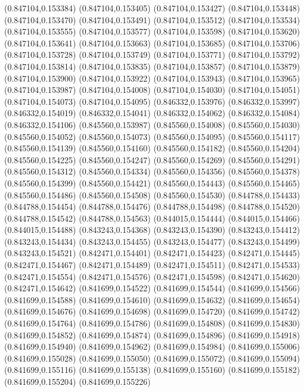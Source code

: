 (0.847104,0.153384)
(0.847104,0.153405)
(0.847104,0.153427)
(0.847104,0.153448)
(0.847104,0.153470)
(0.847104,0.153491)
(0.847104,0.153512)
(0.847104,0.153534)
(0.847104,0.153555)
(0.847104,0.153577)
(0.847104,0.153598)
(0.847104,0.153620)
(0.847104,0.153641)
(0.847104,0.153663)
(0.847104,0.153685)
(0.847104,0.153706)
(0.847104,0.153728)
(0.847104,0.153749)
(0.847104,0.153771)
(0.847104,0.153792)
(0.847104,0.153814)
(0.847104,0.153835)
(0.847104,0.153857)
(0.847104,0.153879)
(0.847104,0.153900)
(0.847104,0.153922)
(0.847104,0.153943)
(0.847104,0.153965)
(0.847104,0.153987)
(0.847104,0.154008)
(0.847104,0.154030)
(0.847104,0.154051)
(0.847104,0.154073)
(0.847104,0.154095)
(0.846332,0.153976)
(0.846332,0.153997)
(0.846332,0.154019)
(0.846332,0.154041)
(0.846332,0.154062)
(0.846332,0.154084)
(0.846332,0.154106)
(0.845560,0.153987)
(0.845560,0.154008)
(0.845560,0.154030)
(0.845560,0.154052)
(0.845560,0.154073)
(0.845560,0.154095)
(0.845560,0.154117)
(0.845560,0.154139)
(0.845560,0.154160)
(0.845560,0.154182)
(0.845560,0.154204)
(0.845560,0.154225)
(0.845560,0.154247)
(0.845560,0.154269)
(0.845560,0.154291)
(0.845560,0.154312)
(0.845560,0.154334)
(0.845560,0.154356)
(0.845560,0.154378)
(0.845560,0.154399)
(0.845560,0.154421)
(0.845560,0.154443)
(0.845560,0.154465)
(0.845560,0.154486)
(0.845560,0.154508)
(0.845560,0.154530)
(0.844788,0.154433)
(0.844788,0.154454)
(0.844788,0.154476)
(0.844788,0.154498)
(0.844788,0.154520)
(0.844788,0.154542)
(0.844788,0.154563)
(0.844015,0.154444)
(0.844015,0.154466)
(0.844015,0.154488)
(0.843243,0.154368)
(0.843243,0.154390)
(0.843243,0.154412)
(0.843243,0.154434)
(0.843243,0.154455)
(0.843243,0.154477)
(0.843243,0.154499)
(0.843243,0.154521)
(0.842471,0.154401)
(0.842471,0.154423)
(0.842471,0.154445)
(0.842471,0.154467)
(0.842471,0.154489)
(0.842471,0.154511)
(0.842471,0.154533)
(0.842471,0.154554)
(0.842471,0.154576)
(0.842471,0.154598)
(0.842471,0.154620)
(0.842471,0.154642)
(0.841699,0.154522)
(0.841699,0.154544)
(0.841699,0.154566)
(0.841699,0.154588)
(0.841699,0.154610)
(0.841699,0.154632)
(0.841699,0.154654)
(0.841699,0.154676)
(0.841699,0.154698)
(0.841699,0.154720)
(0.841699,0.154742)
(0.841699,0.154764)
(0.841699,0.154786)
(0.841699,0.154808)
(0.841699,0.154830)
(0.841699,0.154852)
(0.841699,0.154874)
(0.841699,0.154896)
(0.841699,0.154918)
(0.841699,0.154940)
(0.841699,0.154962)
(0.841699,0.154984)
(0.841699,0.155006)
(0.841699,0.155028)
(0.841699,0.155050)
(0.841699,0.155072)
(0.841699,0.155094)
(0.841699,0.155116)
(0.841699,0.155138)
(0.841699,0.155160)
(0.841699,0.155182)
(0.841699,0.155204)
(0.841699,0.155226)
